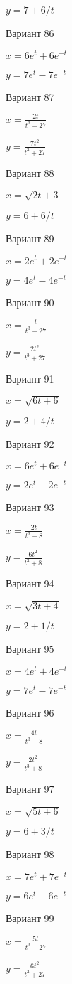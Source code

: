 \documentclass[11pt]{report}
\begin{document}
$y = 7 + 6 / t$

Вариант 86

$x = 6 e^{t} + 6 e^{- t}$

$y = 7 e^{t} - 7 e^{- t}$

Вариант 87

$x = \frac{2 t}{t^{3} + 27}$

$y = \frac{7 t^{2}}{t^{3} + 27}$

Вариант 88

$x = \sqrt{2 t + 3}$

$y = 6 + 6 / t$

Вариант 89

$x = 2 e^{t} + 2 e^{- t}$

$y = 4 e^{t} - 4 e^{- t}$

Вариант 90

$x = \frac{t}{t^{3} + 27}$

$y = \frac{2 t^{2}}{t^{3} + 27}$

Вариант 91

$x = \sqrt{6 t + 6}$

$y = 2 + 4 / t$

Вариант 92

$x = 6 e^{t} + 6 e^{- t}$

$y = 2 e^{t} - 2 e^{- t}$

Вариант 93

$x = \frac{2 t}{t^{3} + 8}$

$y = \frac{6 t^{2}}{t^{3} + 8}$

Вариант 94

$x = \sqrt{3 t + 4}$

$y = 2 + 1 / t$

Вариант 95

$x = 4 e^{t} + 4 e^{- t}$

$y = 7 e^{t} - 7 e^{- t}$

Вариант 96

$x = \frac{4 t}{t^{3} + 8}$

$y = \frac{2 t^{2}}{t^{3} + 8}$

Вариант 97

$x = \sqrt{5 t + 6}$

$y = 6 + 3 / t$

Вариант 98

$x = 7 e^{t} + 7 e^{- t}$

$y = 6 e^{t} - 6 e^{- t}$

Вариант 99

$x = \frac{5 t}{t^{3} + 27}$

$y = \frac{6 t^{2}}{t^{3} + 27}$
\end{document}
